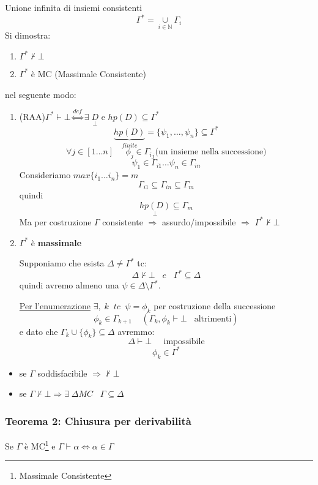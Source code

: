 \documentclass{article}
\theoremstyle{break}
\theoremstyle{break}
\theoremstyle{break}
\theoremstyle{break}
\begin{document}
Unione infinita di insiemi consistenti
\[
  \Gamma^* = \underset{i \in \mathbb{N}}{\cup } \Gamma_i
\] 
Si dimostra:
\begin{enumerate}
  \item \( \Gamma^* \not\vdash \bot \) 
  \item \( \Gamma^* \) è MC (Massimale Consistente) 
\end{enumerate}
nel seguente modo:
\begin{enumerate}
  \item (RAA)\( \Gamma^* \vdash \bot \stackrel{def}{\Leftrightarrow} \exists \; \underset{\bot}{D} \) e \( hp(D) \subseteq \Gamma^* \) 
    \[
      \underbrace{hp(D)}_{finite} = \{\psi_1, \ldots, \psi_n\} \subseteq \Gamma^* 
    \] 
    \[
      \forall j \in [1 \ldots n]\;\;\;\;\;\phi_j \in {\Gamma_i}_j \text{(un insieme nella successione)}
    \] 
    \[
      \psi_1 \in  \Gamma_{i1} \ldots \psi_n \in \Gamma_{in}
    \] 
    Consideriamo \( max \{i_1 \ldots i_n\} = m  \) 
    \[
      \Gamma_{i1} \subseteq \Gamma_{in} \subseteq \Gamma_m
    \] 
    quindi
    \[
      \underset{\bot}{hp(D)} \subseteq \Gamma_{m}
    \] 
    Ma per costruzione \( \Gamma \) consistente \( \Rightarrow \) assurdo/impossibile \( \Rightarrow \) \( \Gamma^* \not\vdash \bot \) 
  \item \( \Gamma^* \) è \textbf{massimale}

    Supponiamo che esista \( \Delta \neq \Gamma^* \) tc:
    \[
    \Delta \not\vdash \bot\;\;\;e\;\;\; \Gamma^* \subseteq \Delta
    \] 
    quindi avremo almeno una \( \psi \in \Delta \setminus \Gamma^* \).

    \underline{Per l'enumerazione} \( \exists,\;k \;\;tc\;\; \psi = \phi_k \) per costruzione
    della successione
    \[
      \phi_k \in \Gamma_{k+1} \;\;\;\; (\Gamma_k, \phi_k \vdash \bot \;\;\; \text{altrimenti})
    \] 
    e dato che \( \Gamma_k \cup \{\phi_k\} \subseteq \Delta\) avremmo:
    \[
    \Delta \vdash \bot\;\;\;\;\; \text{impossibile}
    \] 
    \[
    \phi_k \in \Gamma^*
    \] 
\end{enumerate}
\begin{itemize}
  \item se \( \Gamma \) soddisfacibile \( \Rightarrow \not\vdash \bot \) 
  \item se \( \Gamma \not\vdash \bot \Rightarrow \exists \;\Delta MC\;\;\;\Gamma\subseteq \Delta\) 
\end{itemize}

\subsubsection{Teorema 2: Chiusura per derivabilità}
Se \( \Gamma \) è MC\footnote{Massimale Consistente} e \( \Gamma \vdash \alpha \Leftrightarrow \alpha \in \Gamma\) 
\end{document}
